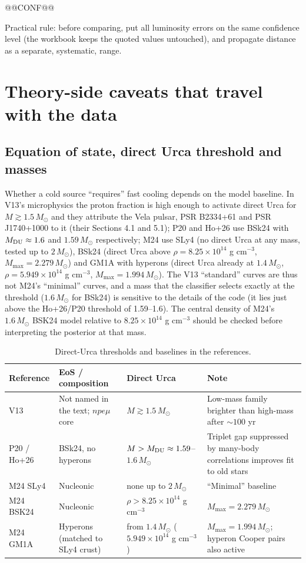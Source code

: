 \documentclass[11pt,a4paper]{article}
\begin{document}
@@CONF@@

Practical rule: before comparing, put all luminosity errors on the same confidence level (the workbook keeps the quoted values untouched), and propagate distance as a separate, systematic, range.

\section{Theory-side caveats that travel with the data}
\subsection{Equation of state, direct Urca threshold and masses}
Whether a cold source ``requires'' fast cooling depends on the model baseline. In V13's microphysics the proton fraction is high enough to activate direct Urca for $M\gtrsim1.5\,M_\odot$ and they attribute the Vela pulsar, PSR B2334+61 and PSR J1740+1000 to it (their Sections 4.1 and 5.1); P20 and Ho+26 use BSk24 with $M_{\rm DU}\approx1.6$ and $1.59\,M_\odot$ respectively; M24 use SLy4 (no direct Urca at any mass, tested up to $2\,M_\odot$), BSk24 (direct Urca above $\rho=8.25\times10^{14}$ g cm$^{-3}$, $M_{\max}=2.279\,M_\odot$) and GM1A with hyperons (direct Urca already at $1.4\,M_\odot$, $\rho=5.949\times10^{14}$ g cm$^{-3}$, $M_{\max}=1.994\,M_\odot$). The V13 ``standard'' curves are thus not M24's ``minimal'' curves, and a mass that the classifier selects exactly at the threshold ($1.6\,M_\odot$ for BSk24) is sensitive to the details of the code (it lies just above the Ho+26/P20 threshold of 1.59--1.6). The central density of M24's $1.6\,M_\odot$ BSK24 model relative to $8.25\times10^{14}$ g cm$^{-3}$ should be checked before interpreting the posterior at that mass.

\begin{table}[htbp]
\centering\small
\caption{Direct-Urca thresholds and baselines in the references.}\label{tab:eos}
\begin{adjustbox}{max width=\textwidth}\begin{tabular}{P{2.6cm}P{4.0cm}P{4.2cm}P{4.2cm}}
\toprule
Reference & EoS / composition & Direct Urca & Note \\
\midrule
V13 & Not named in the text; $npe\mu$ core & $M\gtrsim1.5\,M_\odot$ & Low-mass family brighter than high-mass after $\sim100$ yr \\
P20 / Ho+26 & BSk24, no hyperons & $M>M_{\rm DU}\approx1.59$--$1.6\,M_\odot$ & Triplet gap suppressed by many-body correlations improves fit to old stars \\
M24 SLy4 & Nucleonic & none up to $2\,M_\odot$ & ``Minimal'' baseline \\
M24 BSK24 & Nucleonic & $\rho>8.25\times10^{14}$ g cm$^{-3}$ & $M_{\max}=2.279\,M_\odot$ \\
M24 GM1A & Hyperons (matched to SLy4 crust) & from $1.4\,M_\odot$ ($5.949\times10^{14}$ g cm$^{-3}$) & $M_{\max}=1.994\,M_\odot$; hyperon Cooper pairs also active \\
\bottomrule
\end{tabular}\end{adjustbox}
\end{table}
\end{document}
